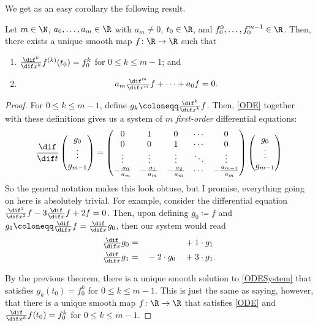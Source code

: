 We get as an easy corollary the following result.
\begin{crl}{}{}
Let $m\in \N$, $a_0,\ldots ,a_m\in \R$ with $a_m\neq 0$, $t_0\in \R$, and $f_0^0,\ldots ,f_0^{m-1}\in \R$.  Then, there exists a unique smooth map $f\colon \R \rightarrow \R$ such that
\begin{enumerate}
\item $\frac{\dif ^k}{\dif x^k}f^{(k)}(t_0)=f_0^k$ for $0\leq k\leq m-1$; and
\item
\begin{equation}\label{ODE}
a_m\tfrac{\dif ^m}{\dif x^m}f+\cdots +a_0f=0.
\end{equation}
\end{enumerate}
\begin{proof}
For $0\leq k\leq m-1$, define $g_k\coloneqq \frac{\dif ^k}{\dif x^k}f$.  Then, \eqref{ODE} together with these definitions gives us a system of $m$ \emph{first-order} differential equations:
{\scriptsize
\begin{equation}\label{ODESystem}
\frac{\dif}{\dif t}\begin{pmatrix}g_0 \\ \vdots \\ g_{m-1}\end{pmatrix}=\begin{pmatrix}0 & 1 & 0 & \cdots & 0 \\ 0 & 0 & 1 & \cdots & 0 \\ \vdots & \vdots & \vdots & \ddots & \vdots \\ -\tfrac{a_0}{a_m} & -\tfrac{a_1}{a_m} & -\tfrac{a_2}{a_m} & \cdots & -\tfrac{a_{m-1}}{a_m}\end{pmatrix}\begin{pmatrix}g_0 \\ \vdots \\ g_{m-1}\end{pmatrix}
\end{equation}
}
So the general notation makes this look obtuse, but I promise, everything going on here is absolutely trivial.  For example, consider the differential equation $\frac{\dif ^2}{\dif x^2}f-3\frac{\dif}{\dif x}f+2f=0$.  Then, upon defining $g_0\coloneqq f$ and $g_1\coloneqq \frac{\dif}{\dif x}f=\frac{\dif}{\dif x}g_0$, then our system would read
\begin{equation}
\begin{aligned}
\tfrac{\dif}{\dif x}g_0 & = & & & & +1\cdot g_1 \\
\tfrac{\dif}{\dif x}g_1 & = & &-2\cdot g_0 & & +3\cdot g_1.
\end{aligned}
\end{equation}

By the previous theorem, there is a unique smooth solution to \eqref{ODESystem} that satisfies $g_k(t_0)=f_0^k$ for $0\leq k\leq m-1$.  This is just the same as saying, however, that there is a unique smooth map $f\colon \R \rightarrow \R$ that satisfies \eqref{ODE} and $\frac{\dif}{\dif x^k}f(t_0)=f_0^k$ for $0\leq k\leq m-1$.
\end{proof}
\end{crl}


